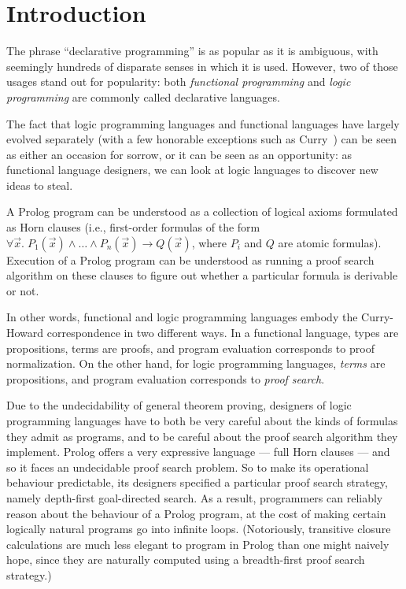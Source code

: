 \section{Introduction}

The phrase ``declarative programming'' is as popular as it is
ambiguous, with seemingly hundreds of disparate senses in which it is
used. However, two of those usages stand out for popularity: both
\emph{functional programming} and \emph{logic programming} are
commonly called declarative languages.

The fact that logic programming languages and functional languages
have largely evolved separately (with a few honorable exceptions such
as Curry~\cite{curry}) can be seen as either an occasion for sorrow,
or it can be seen as an opportunity: as functional language
designers, we can look at logic languages to discover new ideas to
steal.

A Prolog program can be understood as a collection of logical axioms
formulated as Horn clauses (i.e., first-order formulas of the form
$\forall \vec{x}.\;P_1(\vec{x}) \land \ldots \land P_n(\vec{x}) \to
Q(\vec{x})$, where $P_i$ and $Q$ are
atomic formulas).  Execution of a Prolog program can be understood as
running a proof search algorithm on these clauses to figure out
whether a particular formula is derivable or not.

In other words, functional and logic programming languages embody the
Curry-Howard correspondence in two different ways. In a functional
language, types are propositions, terms are proofs, and program
evaluation corresponds to proof normalization. On the other hand, for
logic programming languages, \emph{terms} are propositions, and
program evaluation corresponds to \emph{proof search}.

Due to the undecidability of general theorem proving, designers of
logic programming languages have to both be very careful about the
kinds of formulas they admit as programs, and to be careful about the
proof search algorithm they implement. Prolog offers a very expressive
language --- full Horn clauses --- and so it faces an undecidable
proof search problem. So to make its operational behaviour
predictable, its designers specified a particular proof search
strategy, namely depth-first goal-directed search. As a result,
programmers can reliably reason about the behaviour of a Prolog
program, at the cost of making certain logically natural programs go
into infinite loops. (Notoriously, transitive closure calculations are
much less elegant to program in Prolog than one might naively hope,
since they are naturally computed using a breadth-first proof search
strategy.)

